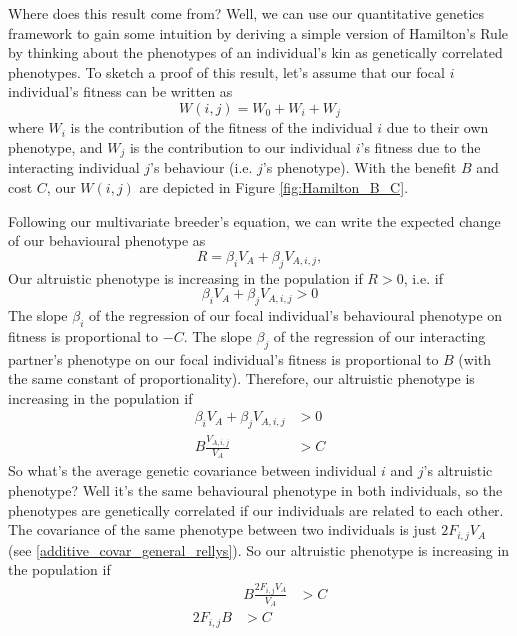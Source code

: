 Where does this result come from? Well, we can use our quantitative genetics framework to gain some 
intuition by deriving a simple version of Hamilton's Rule by thinking
about the phenotypes of an individual's kin as genetically correlated
phenotypes. To sketch a proof of this result, let's assume that our focal $i$ individual's fitness can be written as 
\begin{equation}
W(i,j)= W_0 + W_i +W_j
\end{equation}
where $W_i$ is the contribution of the fitness of the individual $i$ due
to their own phenotype, and $W_j$ is the contribution to our
individual $i$'s fitness due to the interacting individual $j$'s behaviour (i.e. $j$'s phenotype).
With the benefit $B$ and cost $C$, our $W(i,j)$ are depicted in Figure \ref{fig:Hamilton_B_C}. 

Following our multivariate breeder's equation, we can write the expected change of our behavioural phenotype as 
\begin{equation}
R = \beta_i V_A + \beta_j V_{A,i,j},
\end{equation}
Our altruistic phenotype is increasing in the population if $R>0$, i.e. if 
\begin{equation}
  \beta_i V_A + \beta_j V_{A,i,j}  > 0 \end{equation}
 The slope $\beta_i$ of the regression of our focal individual's
behavioural phenotype on fitness is proportional to $-C$. The slope
$\beta_j$ of the regression of our interacting partner's phenotype on
our focal individual's fitness is proportional to $B$ (with the same
constant of proportionality). Therefore, our altruistic phenotype is increasing in the population if
\begin{eqnarray}
  \beta_i V_A + \beta_j V_{A,i,j} & > 0  \nonumber  \\
 B \frac{V_{A,i,j}}{V_A} & >  C
\end{eqnarray}
So what's the average genetic covariance between
individual $i$ and $j$'s altruistic phenotype? Well it's the same behavioural phenotype in both individuals, so the phenotypes are genetically correlated if our individuals are related to each other. The covariance of the same phenotype between two individuals is just $2 F_{i,j} V_A$ (see \eqref{additive_covar_general_rellys}). So our altruistic phenotype is increasing in the population if 
\begin{eqnarray}
   & B\frac{2 F_{i,j} V_A}{V_A} &> C \nonumber  \\
  2 F_{i,j} B & > C 
\end{eqnarray}

